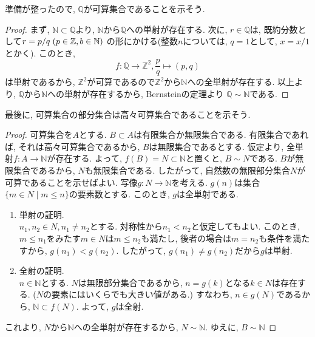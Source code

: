 \documentclass[a4j,dvipdfmx]{jsarticle}
\numberwithin{equation}{section}
\begin{document}
                準備が整ったので, $\mathbb{Q}$が可算集合であることを示そう.
                \begin{proof}
                    まず, $\mathbb{N}\subset \mathbb{Q}$より, $\mathbb{N}$から$\mathbb{Q}$への単射が存在する. 次に, $r\in \mathbb{Q}$は, 既約分数として$r=p/q\hspace{1mm}(p\in\mathbb{Z},b\in\mathbb{N})$
                    の形にかける(整数$n$については, $q=1$として, $x=x/1$とかく). このとき, 
                    \begin{equation*}
                        f:\mathbb{Q}\rightarrow\mathbb{Z}^2,\frac{p}{q}\mapsto (p,q)
                    \end{equation*}
                    は単射であるから, $\mathbb{Z}^2$が可算であるので$\mathbb{Z}^2$から$\mathbb{N}$への全単射が存在する. 以上より, $\mathbb{Q}$から$\mathbb{N}$への単射が存在するから, Bernsteinの定理より
                    $\mathbb{Q}\sim \mathbb{N}$である.
                \end{proof}
                \clearpage
                最後に, 可算集合の部分集合は高々可算集合であることを示そう.
                \begin{proof}
                    可算集合を$A$とする. $B\subset A$は有限集合か無限集合である. 有限集合であれば, それは高々可算集合であるから, $B$は無限集合であるとする.
                    仮定より, 全単射$f:A\rightarrow \mathbb{N}$が存在する. よって, $f(B)=N\subset \mathbb{N}$と置くと, $B\sim N$である.
                    $B$が無限集合であるから, $N$も無限集合である. したがって, 自然数の無限部分集合$N$が可算であることを示せばよい.
                    写像$g:N\rightarrow\mathbb{N}$を考える. $g(n)$は集合$\{m\in N\mid m\leq n\}$の要素数とする. このとき, $g$は全単射である.
                    \begin{enumerate}
                        \item 単射の証明.\\
                        $n_1,n_2\in N,n_1\neq n_2$とする. 対称性から$n_1<n_2$と仮定してもよい. このとき, $m\leq n_1$をみたす$m\in N$は$m\leq n_2$も満たし, 
                        後者の場合は$m=n_2$も条件を満たすから, $g(n_1)<g(n_2)$. したがって, $g(n_1)\neq g(n_2)$だから$g$は単射.
                        \item 全射の証明.\\
                        $n\in \mathbb{N}$とする. $N$は無限部分集合であるから, $n=g(k)$となる$k\in N$は存在する. ($N$の要素にはいくらでも大きい値がある.)
                        すなわち, $n\in g(N)$であるから, $\mathbb{N}\subset f(N)$. よって, $g$は全射.
                    \end{enumerate}
                    これより, $N$から$\mathbb{N}$への全単射が存在するから, $N\sim\mathbb{N}$. ゆえに, $B\sim \mathbb{N}$
                \end{proof}
\end{document}
